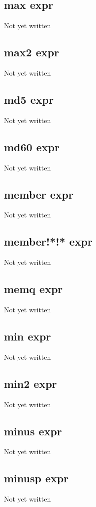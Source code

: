 \documentclass[a4paper,11pt]{article}
\begin{document}
{\subsection{\ttfamily max expr}
Not yet written

\subsection{\ttfamily max2 expr}
Not yet written

\subsection{\ttfamily md5 expr}
Not yet written

\subsection{\ttfamily md60 expr}
Not yet written

\subsection{\ttfamily member expr}
Not yet written

\subsection{\ttfamily member!*!* expr}
Not yet written

\subsection{\ttfamily memq expr}
Not yet written

\subsection{\ttfamily min expr}
Not yet written

\subsection{\ttfamily min2 expr}
Not yet written

\subsection{\ttfamily minus expr}
Not yet written

\subsection{\ttfamily minusp expr}
Not yet written

}
\end{document}
